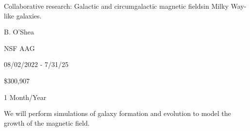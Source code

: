 
 Collaborative research: Galactic and circumgalactic magnetic
fieldsin Milky Way-like galaxies.

 B. O'Shea

 NSF AAG 

 08/02/2022 - 7/31/25

 \$300,907

 1 Month/Year

We will perform simulations of galaxy formation and evolution to model the
growth of the magnetic field.
